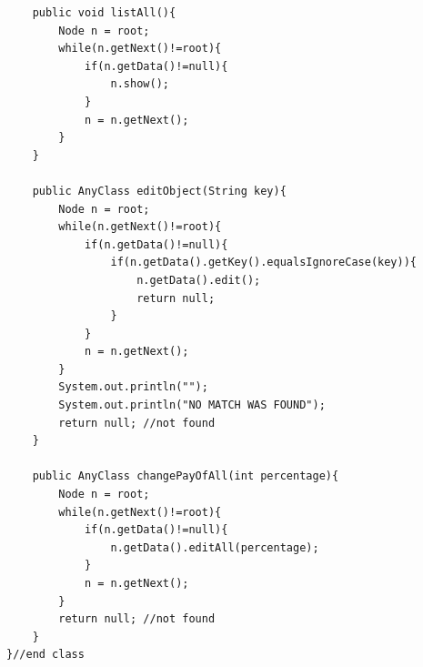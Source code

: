 \documentclass[12pt]{article}
\begin{document}
\begin{lstlisting}
    public void listAll(){
        Node n = root;
        while(n.getNext()!=root){
            if(n.getData()!=null){
                n.show();
            }
            n = n.getNext();
        }
    }

    public AnyClass editObject(String key){
        Node n = root;
        while(n.getNext()!=root){
            if(n.getData()!=null){
                if(n.getData().getKey().equalsIgnoreCase(key)){                   
                    n.getData().edit();   
                    return null;              
                }
            }
            n = n.getNext();
        }
        System.out.println("");
        System.out.println("NO MATCH WAS FOUND");
        return null; //not found
    }

    public AnyClass changePayOfAll(int percentage){
        Node n = root;
        while(n.getNext()!=root){
            if(n.getData()!=null){
                n.getData().editAll(percentage);
            }
            n = n.getNext();
        }
        return null; //not found
    }
}//end class


\end{lstlisting}
\newpage
\end{document}
